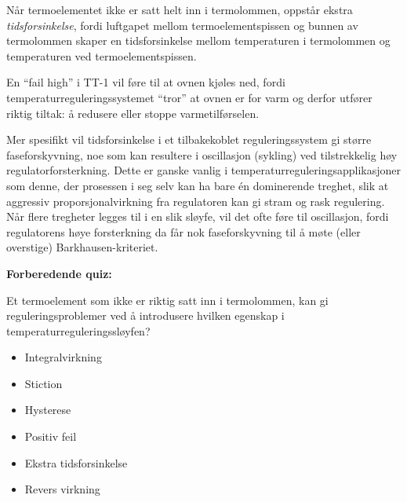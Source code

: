





Når termoelementet ikke er satt helt inn i termolommen, oppstår ekstra {\it tidsforsinkelse}, fordi luftgapet mellom termoelementspissen og bunnen av termolommen skaper en tidsforsinkelse mellom temperaturen i termolommen og temperaturen ved termoelementspissen.







En ``fail high'' i TT-1 vil føre til at ovnen kjøles ned, fordi temperaturreguleringssystemet ``tror'' at ovnen er for varm og derfor utfører riktig tiltak: å redusere eller stoppe varmetilførselen.

\vskip 10pt

Mer spesifikt vil tidsforsinkelse i et tilbakekoblet reguleringssystem gi større faseforskyvning, noe som kan resultere i oscillasjon (sykling) ved tilstrekkelig høy regulatorforsterkning. Dette er ganske vanlig i temperaturreguleringsapplikasjoner som denne, der prosessen i seg selv kan ha bare én dominerende treghet, slik at aggressiv proporsjonalvirkning fra regulatoren kan gi stram og rask regulering. Når flere tregheter legges til i en slik sløyfe, vil det ofte føre til oscillasjon, fordi regulatorens høye forsterkning da får nok faseforskyvning til å møte (eller overstige) Barkhausen-kriteriet.

\vfil \eject

\noindent
{\bf Forberedende quiz:}

Et termoelement som ikke er riktig satt inn i termolommen, kan gi reguleringsproblemer ved å introdusere hvilken egenskap i temperaturreguleringssløyfen?

\begin{itemize}
\item{} Integralvirkning
\vskip 10pt
\item{} Stiction
\vskip 10pt
\item{} Hysterese
\vskip 10pt
\item{} Positiv feil
\vskip 10pt
\item{} Ekstra tidsforsinkelse
\vskip 10pt
\item{} Revers virkning
\end{itemize}





